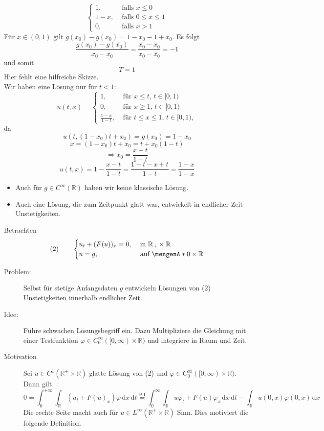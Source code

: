 \begin{enumerate}[1.)]
\begin{beispiel}
\[\begin{cases}
				1, &\text{ falls }x \leq 0\\
				1-x, &\text{ falls } 0 \leq x \leq 1 \\
				0, &\text{ falls }x >1
			\end{cases}
		\]
		Für $x \in (0,1)$ gilt $g(x_0) - g(\bar{x_0}) = 1 - x_0 - 1+ \bar{x_0}$.
		Es folgt
		\[
			\frac{g(x_0)-g(\bar{x_0})}{x_0- \bar{x_0}} = \frac{\bar{x_0}-x_0}{x_0-\bar{x_0}} = -1
		\]
		und somit
		\[
			T=1
		\]
		Hier fehlt eine hilfreiche Skizze.  \\
		Wir haben eine Lösung nur für $t<1:$
		\[
			u(t,x) = \begin{cases}
				1, &\text{ für }x \leq t, \, t \in [0,1)\\
				0, &\text{ für }x \geq 1, \, t \in [0,1)\\
				\frac{1-x}{1-t},& \text{ für }t \leq x \leq 1, \, t \in [0,1),
			\end{cases}
		\]
		da 
		\[
			u(t,(1-x_0)t+x_0) = g(x_0) = 1-x_0
		\]
		\[
			x = (1-x_0)t + x_0 = t + x_0 (1-t)
		\]
		\[
			\Rightarrow x_0 = \frac{x-t}{1-t}
		\]
		\[
			u(t,x)= 1- \frac{x-t}{1-t} = \frac{1-t-x+t}{1-t} = \frac{1-x}{1-x}
		\]
	\end{beispiel}
	\begin{bemerkung}
		\begin{itemize}
			\item Auch für $g \in C^{\infty}(\mathbb{R})$ haben wir keine klassische Lösung.
			\item Auch eine Lösung, die zum Zeitpunkt glatt war, entwickelt in endlicher Zeit Unstetigkeiten.
		\end{itemize}
	\end{bemerkung}
\end{enumerate}
Betrachten 
\[
	(2) \qquad \begin{cases}
		u_t + (F(u))_x = 0, &\text{ in }\mathbb{R}_+ \times \mathbb{R}\\
		u=g , &\text{ auf } \set{0} \times \mathbb{R}
	\end{cases}
\]
\begin{description}
	\item[Problem:]Selbst für stetige Anfangsdaten $g$ entwickeln Lösungen von (2) Unstetigkeiten innerhalb endlicher Zeit.
	\item[Idee:] Führe schwachen Lösungsbegriff ein. Dazu Multipliziere die Gleichung mit einer Testfunktion $\varphi \in C^{\infty}_0([0,\infty) \times \mathbb{R})$
	und integriere in Raum und Zeit.
	\item[Motivation] Sei $u \in C^1(\mathbb{R}^+ \times \mathbb{R})$ glatte Lösung von (2) und $\varphi \in C^{\infty}_0([0, \infty) \times \mathbb{R})$. Dann gilt
	\[
		0 = \int_{0}^{+ \infty} \int_{\mathbb{R}}^{} (u_t + F(u)_x) \varphi \,\mathrm{d}x \,\mathrm{d}t \stackrel{\text{P.I}}{=} \int_{0}^{\infty} \int_{\mathbb{R}}^{}
		u \varphi_t + F(u) \varphi_x \,\mathrm{d}x \,\mathrm{d}t - \int_{\mathbb{R}}^{} u(0,x)\varphi(0,x) \,\mathrm{d}x
	\] 
	Die rechte Seite macht auch für $u \in L^{\infty}(\mathbb{R}^+ \times \mathbb{R})$ Sinn. Dies motiviert die folgende Definition.
\end{description}
